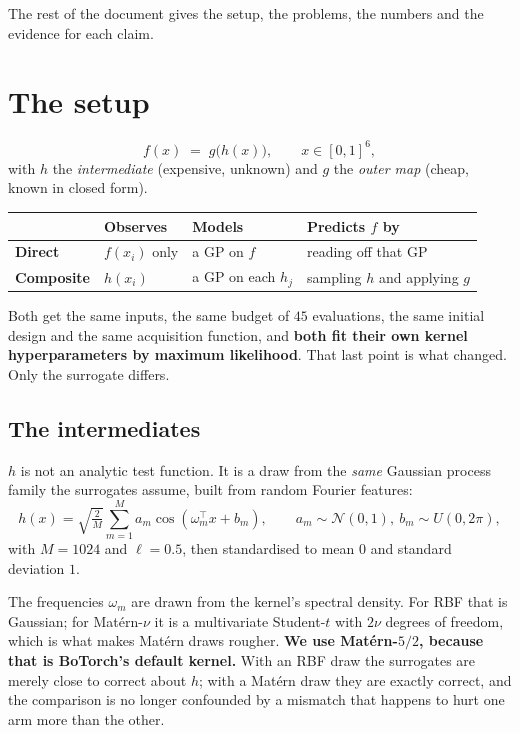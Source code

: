 \documentclass[11pt]{article}
\begin{document}
\noindent The rest of the document gives the setup, the problems, the numbers
and the evidence for each claim.

\section{The setup}

\[
f(x) \;=\; g\bigl(h(x)\bigr), \qquad x \in [0,1]^6 ,
\]
with $h$ the \emph{intermediate} (expensive, unknown) and $g$ the \emph{outer
map} (cheap, known in closed form).

\begin{center}
\begin{tabular}{llll}
\toprule
 & Observes & Models & Predicts $f$ by \\
\midrule
\textbf{Direct} & $f(x_i)$ only & a GP on $f$ & reading off that GP \\
\textbf{Composite} & $h(x_i)$ & a GP on each $h_j$ & sampling $h$ and applying $g$ \\
\bottomrule
\end{tabular}
\end{center}

\noindent Both get the same inputs, the same budget of $45$ evaluations, the
same initial design and the same acquisition function, and \textbf{both fit
their own kernel hyperparameters by maximum likelihood}. That last point is
what changed. Only the surrogate differs.

\subsection{The intermediates}

$h$ is not an analytic test function. It is a draw from the \emph{same}
Gaussian process family the surrogates assume, built from random Fourier
features:
\[
h(x)=\sqrt{\tfrac{2}{M}}\sum_{m=1}^{M} a_m\cos(\omega_m^\top x + b_m),
\qquad a_m\sim\mathcal N(0,1),\ b_m\sim U(0,2\pi),
\]
with $M=1024$ and $\ell=0.5$, then standardised to mean $0$ and standard
deviation $1$.

The frequencies $\omega_m$ are drawn from the kernel's spectral density. For
RBF that is Gaussian; for Mat\'ern-$\nu$ it is a multivariate Student-$t$ with
$2\nu$ degrees of freedom, which is what makes Mat\'ern draws rougher.
\textbf{We use Mat\'ern-$5/2$, because that is BoTorch's default kernel.} With
an RBF draw the surrogates are merely close to correct about $h$; with a
Mat\'ern draw they are exactly correct, and the comparison is no longer
confounded by a mismatch that happens to hurt one arm more than the other.
\end{document}
